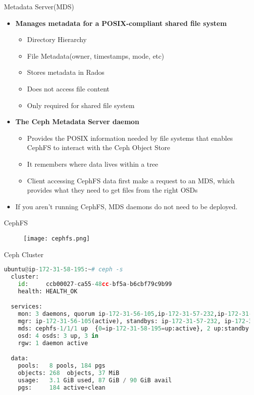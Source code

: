 \begin{frame}{Metadata Server(MDS)}
    \begin{itemize}
        \item \textbf{Manages metadata for a POSIX-compliant shared file system}
            \begin{itemize}
                \item Directory Hierarchy
                \item File Metadata(owner, timestamps, mode, etc)
                \item Stores metadata in Rados
                \item Does not access file content
                \item Only required for shared file system
            \end{itemize}
        \item \textbf{The Ceph Metadata Server daemon}
            \begin{itemize}
                \item Provides the POSIX information needed by file systems that enables CephFS to interact with the Ceph Object Store
                \item It remembers where data lives within a tree
                \item Client accessing CephFS data first make a request to an MDS, which provides what they need to get files from the right OSDs
            \end{itemize}
        \item If you aren't running CephFS, MDS daemons do not need to be deployed. 

    \end{itemize}
\end{frame}

\begin{frame}{CephFS}
    \begin{figure}[htpb]
        \centering
        \texttt{[image: cephfs.png]}
    \end{figure}
\end{frame}

\begin{frame}[fragile]{Ceph Cluster}
\begin{lstlisting}[language=python]
ubuntu@ip-172-31-58-195:~# ceph -s
  cluster:
    id:     ccb00027-ca55-48cc-bf5a-b6cbf79c9b99
    health: HEALTH_OK

  services:
    mon: 3 daemons, quorum ip-172-31-56-105,ip-172-31-57-232,ip-172-31-58-195
    mgr: ip-172-31-56-105(active), standbys: ip-172-31-57-232, ip-172-31-58-195
    mds: cephfs-1/1/1 up  {0=ip-172-31-58-195=up:active}, 2 up:standby
    osd: 4 osds: 3 up, 3 in
    rgw: 1 daemon active

  data:
    pools:   8 pools, 184 pgs
    objects: 268  objects, 37 MiB
    usage:   3.1 GiB used, 87 GiB / 90 GiB avail
    pgs:     184 active+clean    
\end{lstlisting}
\end{frame}

